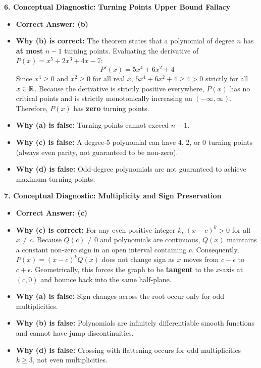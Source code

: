 \textbf{6. Conceptual Diagnostic: Turning Points Upper Bound Fallacy}
\begin{itemize}
    \item \textbf{Correct Answer: (b)}
    \item \textbf{Why (b) is correct:} The theorem states that a polynomial of degree $n$ has \textbf{at most} $n - 1$ turning points. Evaluating the derivative of $P(x) = x^5 + 2x^3 + 4x - 7$:
    $$P'(x) = 5x^4 + 6x^2 + 4$$
    Since $x^4 \ge 0$ and $x^2 \ge 0$ for all real $x$, $5x^4 + 6x^2 + 4 \ge 4 > 0$ strictly for all $x \in \mathbb{R}$. Because the derivative is strictly positive everywhere, $P(x)$ has no critical points and is strictly monotonically increasing on $(-\infty, \infty)$. Therefore, $P(x)$ has \textbf{zero} turning points.
    \item \textbf{Why (a) is false:} Turning points cannot exceed $n - 1$.
    \item \textbf{Why (c) is false:} A degree-5 polynomial can have 4, 2, or 0 turning points (always even parity, not guaranteed to be non-zero).
    \item \textbf{Why (d) is false:} Odd-degree polynomials are not guaranteed to achieve maximum turning points.
\end{itemize}

\textbf{7. Conceptual Diagnostic: Multiplicity and Sign Preservation}
\begin{itemize}
    \item \textbf{Correct Answer: (c)}
    \item \textbf{Why (c) is correct:} For any even positive integer $k$, $(x - c)^k > 0$ for all $x \neq c$. Because $Q(c) \neq 0$ and polynomials are continuous, $Q(x)$ maintains a constant non-zero sign in an open interval containing $c$. Consequently, $P(x) = (x - c)^k Q(x)$ does not change sign as $x$ moves from $c - \epsilon$ to $c + \epsilon$. Geometrically, this forces the graph to be \textbf{tangent} to the $x$-axis at $(c, 0)$ and bounce back into the same half-plane.
    \item \textbf{Why (a) is false:} Sign changes across the root occur only for odd multiplicities.
    \item \textbf{Why (b) is false:} Polynomials are infinitely differentiable smooth functions and cannot have jump discontinuities.
    \item \textbf{Why (d) is false:} Crossing with flattening occurs for odd multiplicities $k \ge 3$, not even multiplicities.
\end{itemize}

